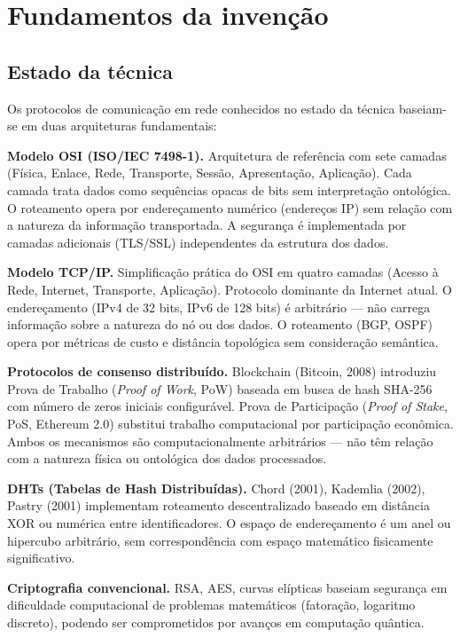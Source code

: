 \documentclass[12pt,a4paper]{article}
\begin{document}
\newpage
\section{Fundamentos da invenção}

\subsection{Estado da técnica}

Os protocolos de comunicação em rede conhecidos no estado da
técnica baseiam-se em duas arquiteturas fundamentais:

\textbf{Modelo OSI (ISO/IEC 7498-1).} Arquitetura de referência
com sete camadas (Física, Enlace, Rede, Transporte, Sessão,
Apresentação, Aplicação). Cada camada trata dados como
sequências opacas de bits sem interpretação ontológica. O
roteamento opera por endereçamento numérico (endereços IP) sem
relação com a natureza da informação transportada. A segurança
é implementada por camadas adicionais (TLS/SSL) independentes
da estrutura dos dados.

\textbf{Modelo TCP/IP.} Simplificação prática do OSI em quatro
camadas (Acesso à Rede, Internet, Transporte, Aplicação).
Protocolo dominante da Internet atual. O endereçamento (IPv4 de
32 bits, IPv6 de 128 bits) é arbitrário --- não carrega
informação sobre a natureza do nó ou dos dados. O roteamento
(BGP, OSPF) opera por métricas de custo e distância topológica
sem consideração semântica.

\textbf{Protocolos de consenso distribuído.} Blockchain (Bitcoin,
2008) introduziu Prova de Trabalho (\textit{Proof of Work},
PoW) baseada em busca de hash SHA-256 com número de zeros
iniciais configurável. Prova de Participação (\textit{Proof of
Stake}, PoS, Ethereum 2.0) substitui trabalho computacional por
participação econômica. Ambos os mecanismos são
computacionalmente arbitrários --- não têm relação com a
natureza física ou ontológica dos dados processados.

\textbf{DHTs (Tabelas de Hash Distribuídas).} Chord (2001),
Kademlia (2002), Pastry (2001) implementam roteamento
descentralizado baseado em distância XOR ou numérica entre
identificadores. O espaço de endereçamento é um anel ou
hipercubo arbitrário, sem correspondência com espaço
matemático fisicamente significativo.

\textbf{Criptografia convencional.} RSA, AES, curvas elípticas
baseiam segurança em dificuldade computacional de problemas
matemáticos (fatoração, logaritmo discreto), podendo ser
comprometidos por avanços em computação quântica.
\end{document}
